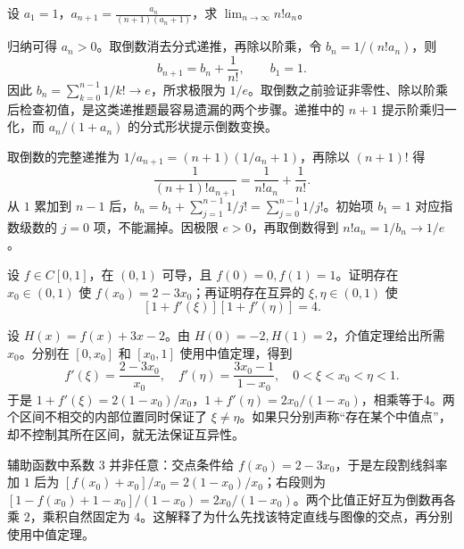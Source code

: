 \documentclass[12pt,fontset=fandol]{ctexart}
\begin{document}
\begin{example}\label{nm-2020-2}
设 $a_1=1$，$\displaystyle a_{n+1}=\frac{a_n}{(n+1)(a_n+1)}$，求 $\lim_{n\to\infty}n!a_n$。
\end{example}
\begin{solve}
归纳可得 $a_n>0$。取倒数消去分式递推，再除以阶乘，令 $b_n=1/(n!a_n)$，则
\[
 b_{n+1}=b_n+\frac1{n!},\qquad b_1=1.
\]
因此 $b_n=\sum_{k=0}^{n-1}1/k!\to e$，所求极限为 $1/e$。取倒数之前验证非零性、除以阶乘后检查初值，是这类递推题最容易遗漏的两个步骤。递推中的 $n+1$ 提示阶乘归一化，而 $a_n/(1+a_n)$ 的分式形状提示倒数变换。

取倒数的完整递推为 $1/a_{n+1}=(n+1)(1/a_n+1)$，再除以 $(n+1)!$ 得
\[
\frac1{(n+1)!a_{n+1}}=\frac1{n!a_n}+\frac1{n!}.
\]
从 $1$ 累加到 $n-1$ 后，$b_n=b_1+\sum_{j=1}^{n-1}1/j!=\sum_{j=0}^{n-1}1/j!$。初始项 $b_1=1$ 对应指数级数的 $j=0$ 项，不能漏掉。因极限 $e>0$，再取倒数得到 $n!a_n=1/b_n\to1/e$。

\end{solve}

\begin{example}\label{nm-2020-3}
设 $f\in C[0,1]$，在 $(0,1)$ 可导，且 $f(0)=0,f(1)=1$。证明存在 $x_0\in(0,1)$ 使 $f(x_0)=2-3x_0$；再证明存在互异的 $\xi,\eta\in(0,1)$ 使
\[
 [1+f'(\xi)][1+f'(\eta)]=4.
\]
\end{example}
\begin{solve}
设 $H(x)=f(x)+3x-2$。由 $H(0)=-2,H(1)=2$，介值定理给出所需 $x_0$。分别在 $[0,x_0]$ 和 $[x_0,1]$ 使用中值定理，得到
\[
 f'(\xi)=\frac{2-3x_0}{x_0},\quad
 f'(\eta)=\frac{3x_0-1}{1-x_0},\quad
 0<\xi<x_0<\eta<1.
\]
于是 $1+f'(\xi)=2(1-x_0)/x_0$，$1+f'(\eta)=2x_0/(1-x_0)$，相乘等于4。两个区间不相交的内部位置同时保证了 $\xi\ne\eta$。如果只分别声称“存在某个中值点”，却不控制其所在区间，就无法保证互异性。

辅助函数中系数 $3$ 并非任意：交点条件给 $f(x_0)=2-3x_0$，于是左段割线斜率加 $1$ 后为 $[f(x_0)+x_0]/x_0=2(1-x_0)/x_0$；右段则为 $[1-f(x_0)+1-x_0]/(1-x_0)=2x_0/(1-x_0)$。两个比值正好互为倒数再各乘 $2$，乘积自然固定为 $4$。这解释了为什么先找该特定直线与图像的交点，再分别使用中值定理。

\end{solve}
\end{document}
